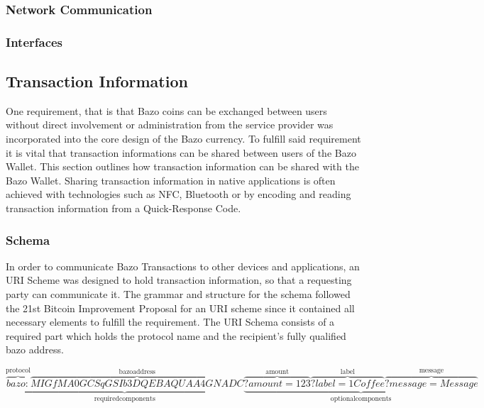 \documentclass[a4paper]{article}
\begin{document}
\subsubsection{Network Communication}
\subsubsection{Interfaces}

\subsection{Transaction Information}
One requirement, that is that Bazo coins can be exchanged between users without direct involvement or administration from the service provider was incorporated into the core design of the Bazo currency. To fulfill said requirement it is vital that transaction informations can be shared between users of the Bazo Wallet. This section outlines how transaction information can be shared with the Bazo Wallet.
Sharing transaction information in native applications is often achieved with technologies such as NFC, Bluetooth or by encoding and reading transaction information from a Quick-Response Code.
\subsubsection{Schema}
In order to communicate Bazo Transactions to other devices and applications, an URI Scheme was designed to hold transaction information, so that a requesting party can communicate it. The grammar and structure for the schema followed the \cite{bip21} 21st Bitcoin Improvement Proposal for an URI scheme since it contained all necessary elements to fulfill the requirement. The URI Schema consists of a required part which holds the protocol name and the recipient's fully qualified bazo address.


\[
\underbrace{\overbrace{bazo:}^{\mathrm{protocol}}\overbrace{MIGfMA0GCSqGSIb3DQEBAQUAA4GNADC}^{\mathrm{bazo address}}}_{\mathrm{required components}}
\underbrace{\overbrace{?amount=123}^{\mathrm{amoun t}}\overbrace{?label=1 Coffee}^{\mathrm{label}}\overbrace{?message=Message}^{\mathrm{message}}}_{\mathrm{optional components}}
\]
\end{document}
